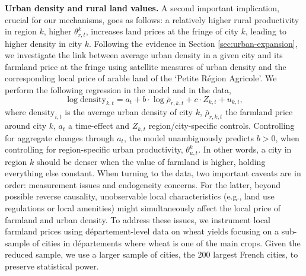 \documentclass[./20250130-paper.tex]{subfiles}
\begin{document}
\noindent \textbf{Urban density and rural land values.} A second important implication, crucial for our mechanisms, goes as follows: a relatively higher rural productivity in region $k$, higher $\theta^k_{r,t}$, increases land prices at the fringe of city $k$, leading to higher density in city $k$. Following the evidence in Section \ref{sec:urban-expansion}, we investigate  the link between average urban density in a given city and its farmland price at the fringe using satellite measures of urban density and the corresponding local price of arable land of the `Petite Région Agricole'. We perform the following regression in the model and in the data,
\begin{equation}
\log \text{density}_{k,t} = a_t + b \cdot \log \bar{\rho}_{r,k,t}+ c \cdot Z_{k,t} + u_{k,t},
\label{reg:densityruralprice}
\end{equation}
where $\text{density}_{i,t}$ is the average urban density of city $k$, $\bar{\rho}_{r,k,t}$ the farmland price around city $k$, $a_t$ a time-effect and $Z_{k,t}$ region/city-specific controls. Controlling for aggregate changes through $a_t$, the model unambiguously predicts $b>0$, when controlling for region-specific urban productivity, $\theta^k_{u,t}$. In other words, a city in region $k$ should be denser when the value of farmland is higher, holding everything else constant. When turning to the data, two important caveats are in order: measurement issues and endogeneity concerns. For the latter, beyond possible reverse causality, unobservable local characteristics (e.g., land use regulations or local amenities) might simultaneously affect the local price of farmland and urban density. To address these issues, we instrument local farmland prices using département-level data on wheat yields focusing on a sub-sample of cities in départements where wheat is one of the main crops. Given the reduced sample, we use a larger sample of cities, the 200 largest French cities, to preserve statistical power. 
\end{document}
